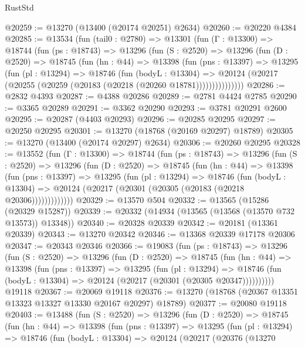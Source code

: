 \begin{lexlean}{RustStd}
\begin{coremodule}
@20259 := @13270 (@13400 (@20174 @20251) @2634)
@20260 := @20220 @4384
@20285 := @13534
    (fun (tail0 : @2780) =>
    @13301
      (fun (Γ : @13300) =>
      @18744
        (fun (ps : @18743) =>
        @13296
          (fun (S : @2520) =>
          @13296
            (fun (D : @2520) =>
            @18745
              (fun (hn : @44) =>
              @13398
                (fun (pns : @13397) =>
                @13295
                  (fun (pl : @13294) =>
                  @18746
                    (fun (bodyL : @13304) =>
                    @20124 (@20217 (@20255 (@20259 (@20183 (@20218 (@20260 @18781)))))))))))))))
@20286 := @2832 @4393
@20287 := @4388 @20286
@20289 := @2781 @4424 @2785
@20290 := @3365 @20289
@20291 := @3362 @20290
@20293 := @3781 @20291 @2600
@20295 := @20287 (@4403 @20293)
@20296 := @20285 @20295
@20297 := @20250 @20295
@20301 := @13270 (@18768 (@20169 @20297) @18789)
@20305 := @13270 (@13400 (@20174 @20297) @2634)
@20306 := @20260 @20295
@20328 := @13552
    (fun (Γ : @13300) =>
    @18744
      (fun (ps : @18743) =>
      @13296
        (fun (S : @2520) =>
        @13296
          (fun (D : @2520) =>
          @18745
            (fun (hn : @44) =>
            @13398
              (fun (pns : @13397) =>
              @13295
                (fun (pl : @13294) =>
                @18746
                  (fun (bodyL : @13304) =>
                  @20124 (@20217 (@20301 (@20305 (@20183 (@20218 @20306)))))))))))))
@20329 := @13570 @504
@20332 := @13565 (@15286 (@20329 @15287))
@20339 := @20332 (@14934 (@13565 (@13568 (@13570 @732 @13573)) @13348))
@20340 := @20328 @20339
@20342 := @20181 (@13361 @20339)
@20343 := @13270 @20342
@20346 := @13368 @20339 @17178 @20306
@20347 := @20343 @20346
@20366 := @19083
    (fun (ps : @18743) =>
    @13296
      (fun (S : @2520) =>
      @13296
        (fun (D : @2520) =>
        @18745
          (fun (hn : @44) =>
          @13398
            (fun (pns : @13397) =>
            @13295
              (fun (pl : @13294) =>
              @18746 (fun (bodyL : @13304) => @20124 (@20217 (@20301 (@20305 @20347))))))))))
    @19118
@20367 := @20069 @19118
@20376 := @13270 (@18768 (@20367 @13351 @13323 @13327 @13330 @20167 @20297) @18789)
@20377 := @20080 @19118
@20403 := @13488
    (fun (S : @2520) =>
    @13296
      (fun (D : @2520) =>
      @18745
        (fun (hn : @44) =>
        @13398
          (fun (pns : @13397) =>
          @13295
            (fun (pl : @13294) =>
            @18746
              (fun (bodyL : @13304) =>
              @20124
                (@20217
                  (@20376
                    (@13270

\end{coremodule}
\end{lexlean}
